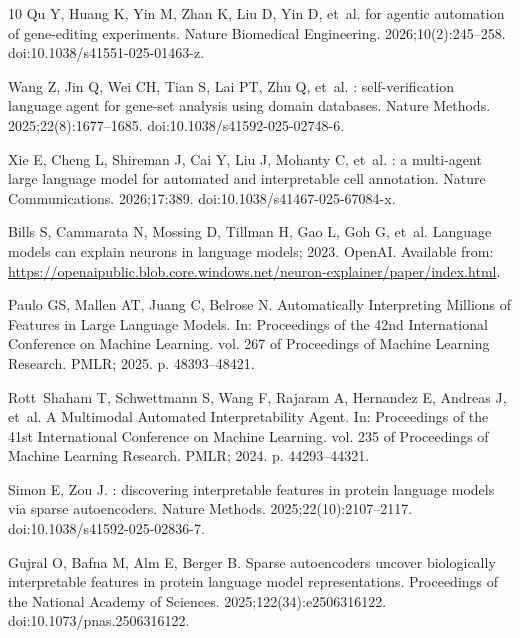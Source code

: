 \documentclass[10pt,letterpaper]{article}
\begin{document}
\begin{thebibliography}{10}
Qu Y, Huang K, Yin M, Zhan K, Liu D, Yin D, et~al.
 for agentic automation of gene-editing experiments.
\newblock Nature Biomedical Engineering. 2026;10(2):245--258.
\newblock doi:{10.1038/s41551-025-01463-z}.

Wang Z, Jin Q, Wei CH, Tian S, Lai PT, Zhu Q, et~al.
: self-verification language agent for gene-set analysis
  using domain databases.
\newblock Nature Methods. 2025;22(8):1677--1685.
\newblock doi:{10.1038/s41592-025-02748-6}.

Xie E, Cheng L, Shireman J, Cai Y, Liu J, Mohanty C, et~al.
: a multi-agent large language model for automated and
  interpretable cell annotation.
\newblock Nature Communications. 2026;17:389.
\newblock doi:{10.1038/s41467-025-67084-x}.

Bills S, Cammarata N, Mossing D, Tillman H, Gao L, Goh G, et~al. Language
  models can explain neurons in language models; 2023.
\newblock OpenAI.
\newblock Available from:
  \url{https://openaipublic.blob.core.windows.net/neuron-explainer/paper/index.html}.

Paulo GS, Mallen AT, Juang C, Belrose N.
\newblock Automatically Interpreting Millions of Features in Large Language
  Models.
\newblock In: Proceedings of the 42nd International Conference on Machine
  Learning. vol. 267 of Proceedings of Machine Learning Research. PMLR; 2025.
  p. 48393--48421.

Rott~Shaham T, Schwettmann S, Wang F, Rajaram A, Hernandez E, Andreas J, et~al.
\newblock A Multimodal Automated Interpretability Agent.
\newblock In: Proceedings of the 41st International Conference on Machine
  Learning. vol. 235 of Proceedings of Machine Learning Research. PMLR; 2024.
  p. 44293--44321.

Simon E, Zou J.
: discovering interpretable features in protein language
  models via sparse autoencoders.
\newblock Nature Methods. 2025;22(10):2107--2117.
\newblock doi:{10.1038/s41592-025-02836-7}.

Gujral O, Bafna M, Alm E, Berger B.
\newblock Sparse autoencoders uncover biologically interpretable features in
  protein language model representations.
\newblock Proceedings of the National Academy of Sciences.
  2025;122(34):e2506316122.
\newblock doi:{10.1073/pnas.2506316122}.


\end{thebibliography}
\end{document}
